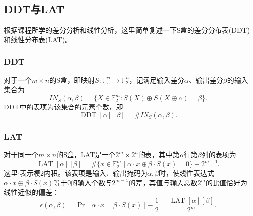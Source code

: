\subsection{DDT与LAT}
根据课程所学的差分分析和线性分析，这里简单复述一下S盒的差分分布表(DDT)和线性分布表(LAT)。

\subsubsection{DDT}
对于一个$m \times n$的S盒，即映射$S:\mathbb{F}_2^m \to \mathbb{F}_2^n$，记满足输入差分$\alpha$、输出差分$\beta$的输入集合为
$$
IN_S(\alpha ,\beta) = \{X \in \mathbb{F}_2^m :S(X) \oplus S(X \oplus \alpha) = \beta\}.
$$
DDT中的表项为该集合的元素个数，即
$$
\operatorname{DDT}[\alpha][\beta] = \# IN_S(\alpha,\beta).
$$

\subsubsection{LAT}

对于同一个$m \times n$的S盒，LAT是一个$2^m \times 2^n$的表，其中第$\alpha$行第$\beta$列的表项为
$$
\operatorname{LAT}[\alpha][\beta]
=\#\{x\in\mathbb{F}_2^m\mid \alpha\cdot x\oplus\beta\cdot S(x)=0\}-2^{m-1}.
$$
这里$\cdot$表示模$2$内积。该表项是输入、输出掩码为$\alpha,\beta$时，使线性表达式$\alpha\cdot x\oplus\beta\cdot S(x)$等于$0$的输入个数与$2^{m-1}$的差，其值与输入总数$2^m$的比值恰好为线性近似的偏差：
$$
\epsilon(\alpha,\beta)
=\Pr[\alpha\cdot x=\beta\cdot S(x)]-\frac{1}{2}
=\frac{\operatorname{LAT}[\alpha][\beta]}{2^m}.
$$
